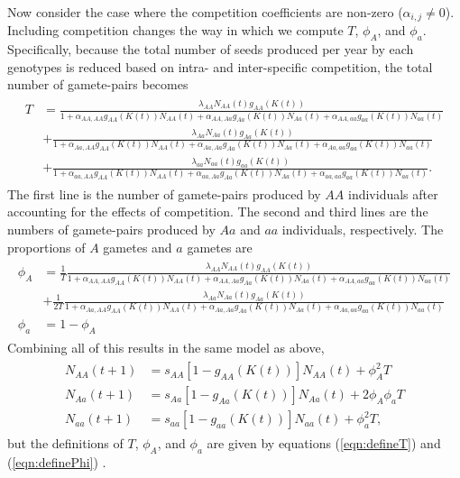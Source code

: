\documentclass[11pt]{article}
\begin{document}
Now consider the case where the competition coefficients are non-zero ($\alpha_{i,j}\neq0$).  Including competition changes the way in which we compute $T$, $\phi_A$, and $\phi_a$.  Specifically, because the total number of seeds produced per year by each genotypes is reduced based on intra- and inter-specific competition, the total number of gamete-pairs becomes
\begin{align}\begin{split}
T &=  \frac{\lambda_{AA}N_{AA}(t)g_{AA}(K(t))}{1+ \alpha_{AA,AA}g_{AA}(K(t))N_{AA}(t) + \alpha_{AA,Aa}g_{Aa}(K(t))N_{Aa}(t)+ \alpha_{AA,aa}g_{aa}(K(t))N_{aa}(t)} \\ 
&+ \frac{\lambda_{Aa}N_{Aa}(t)g_{Aa}(K(t))}{1+ \alpha_{Aa,AA}g_{AA}(K(t))N_{AA}(t) + \alpha_{Aa,Aa}g_{Aa}(K(t))N_{Aa}(t)+ \alpha_{Aa,aa}g_{aa}(K(t))N_{aa}(t)}\\
&+\frac{\lambda_{aa}N_{aa}(t)g_{aa}(K(t))}{1+ \alpha_{aa,AA}g_{AA}(K(t))N_{AA}(t) + \alpha_{aa,Aa}g_{Aa}(K(t))N_{Aa}(t)+ \alpha_{aa,aa}g_{aa}(K(t))N_{aa}(t)}.
\label{eqn:defineT}
\end{split}\end{align}
The first line is the number of gamete-pairs produced by $AA$ individuals after accounting for the effects of competition.  The second and third lines are the numbers of gamete-pairs produced by $Aa$ and $aa$ individuals, respectively. The proportions of $A$ gametes and $a$ gametes are 
\begin{align}\begin{split}
\phi_A &= \frac{1}{T}\frac{\lambda_{AA}N_{AA}(t)g_{AA}(K(t))}{1+ \alpha_{AA,AA}g_{AA}(K(t))N_{AA}(t) + \alpha_{AA,Aa}g_{Aa}(K(t))N_{Aa}(t)+ \alpha_{AA,aa}g_{aa}(K(t))N_{aa}(t)} \\
&+ \frac{1}{2T}\frac{\lambda_{Aa}N_{Aa}(t)g_{Aa}(K(t))}{1+ \alpha_{Aa,AA}g_{AA}(K(t))N_{AA}(t) + \alpha_{Aa,Aa}g_{Aa}(K(t))N_{Aa}(t)+ \alpha_{Aa,aa}g_{aa}(K(t))N_{aa}(t)}\\
\phi_a &= 1- \phi_A
\label{eqn:definePhi}
\end{split}\end{align}
Combining all of this results in the same model as above,
\begin{align}\begin{split}
N_{AA}(t+1) &= s_{AA}[1-g_{AA}(K(t))]N_{AA}(t) + \phi_A^2T\\
N_{Aa}(t+1) &= s_{Aa}[1-g_{Aa}(K(t))]N_{Aa}(t) + 2 \phi_A\phi_aT\\
N_{aa}(t+1) &= s_{aa}[1-g_{aa}(K(t))]N_{aa}(t) + \phi_a^2T,
\end{split}\end{align}
but the definitions of $T$, $\phi_A$, and $\phi_a$ are given by equations (\ref{eqn:defineT}) and (\ref{eqn:definePhi}) . 
\end{document}
